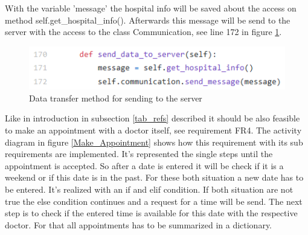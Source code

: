 With the variable 'message' the hospital info will be saved about the access on method self.get_hospital_info(). Afterwards this message will be send to the server with the access to the class Communication, see line 172 in figure \ref{send_hosp_info}. 


\begin{figure}[H]
\centering
\sidecaption
\includegraphics[scale=.7]{images/melanie_images/send_hospital_info.png}
\caption{Data transfer method for sending to the server}
\label{send_hosp_info}
\end{figure}

Like in introduction in subsection \ref{tab_refs} described it should be also feasible to make an appointment with a doctor itself, see requirement FR4. The activity diagram in figure \ref{Make_Appointment} shows how this requirement with its sub requirements are implemented. It's represented the single steps until the appointment is accepted. So after a date is entered it will be check if it is a weekend or if this date is in the past. For these both situation a new date has to be entered. It's realized with an if and elif condition. If both situation are not true the else condition continues and a request for a time will be send. The next step is to check if the entered time is available for this date with the respective doctor. For that all appointments has to be summarized in a dictionary.


